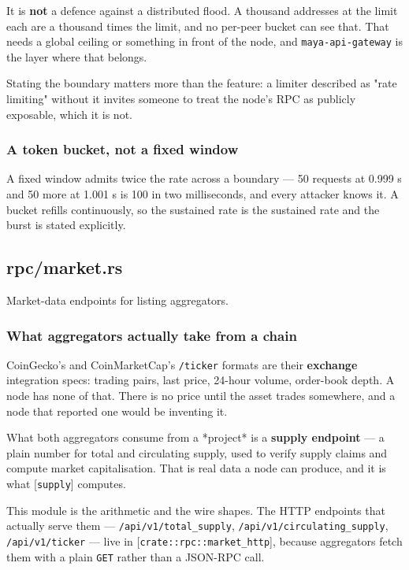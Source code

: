 \documentclass[11pt,a4paper]{article}
\begin{document}
It is \textbf{not} a defence against a distributed flood. A thousand addresses at
the limit each are a thousand times the limit, and no per-peer bucket can
see that. That needs a global ceiling or something in front of the node, and
\texttt{maya-api-gateway} is the layer where that belongs.

Stating the boundary matters more than the feature: a limiter described as
"rate limiting" without it invites someone to treat the node's RPC as
publicly exposable, which it is not.

\subsubsection{A token bucket, not a fixed window}

A fixed window admits twice the rate across a boundary — 50 requests at
0.999 s and 50 more at 1.001 s is 100 in two milliseconds, and every
attacker knows it. A bucket refills continuously, so the sustained rate is
the sustained rate and the burst is stated explicitly.

\subsection{rpc/market.rs}
Market-data endpoints for listing aggregators.

\subsubsection{What aggregators actually take from a chain}

CoinGecko's and CoinMarketCap's \texttt{/ticker} formats are their \textbf{exchange}
integration specs: trading pairs, last price, 24-hour volume, order-book
depth. A node has none of that. There is no price until the asset trades
somewhere, and a node that reported one would be inventing it.

What both aggregators consume from a *project* is a \textbf{supply endpoint} — a
plain number for total and circulating supply, used to verify supply claims
and compute market capitalisation. That is real data a node can produce, and
it is what [\texttt{supply}] computes.

This module is the arithmetic and the wire shapes. The HTTP endpoints that
actually serve them — \texttt{/api/v1/total\_supply}, \texttt{/api/v1/circulating\_supply},
\texttt{/api/v1/ticker} — live in [\texttt{crate::rpc::market\_http}], because aggregators
fetch them with a plain \texttt{GET} rather than a JSON-RPC call.
\end{document}
